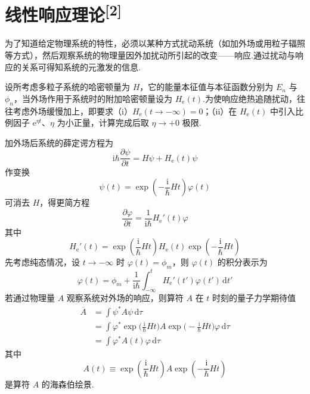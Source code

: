 \section{\texorpdfstring{线性响应理论\textsuperscript{[2]}}{线性响应理论[2]}}

为了知道给定物理系统的特性，必须以某种方式扰动系统（如加外场或用粒子辐照等方式），然后观察系统的物理量因外加扰动所引起的改变——响应.通过扰动与响应的关系可得知系统的元激发的信息.

设所考虑多粒子系统的哈密顿量为 $H$，它的能量本征值与本征函数分别为 $E_{n}$ 与 $\phi_{n}$，当外场作用于系统时的附加哈密顿量设为 $H_{\mathrm{e}}(t)$.为使响应绝热追随扰动，往往考虑外场缓慢加上，即要求（i）$H_{\mathrm{e}}(t\to-\infty)=0$；（ii）在 $H_{\mathrm{e}}(t)$ 中引入比例因子 $\mathrm{e}^{\eta t}$、$\eta$ 为小正量，计算完成后取 $\eta\to+0$ 极限.

加外场后系统的薛定谔方程为
\begin{equation}
  \mathrm{i}\hbar\frac{\partial\psi}{\partial t}
  =H\psi+H_{\mathrm{e}}(t)\psi
\end{equation}
作变换
\begin{equation}
  \psi(t)=\exp\left(-\frac{\mathrm{i}}{\hbar}Ht\right)\varphi(t)
\end{equation}
可消去 $H$，得更简方程
\begin{equation}
  \frac{\partial\varphi}{\partial t}
  =\frac{1}{\mathrm{i}\hbar}H_{\mathrm{e}}'(t)\varphi
\end{equation}
其中
\begin{equation}
  H_{\mathrm{e}}'(t)=\exp\left(\frac{\mathrm{i}}{\hbar}Ht\right)H_{\mathrm{e}}(t)
  \exp\left(-\frac{\mathrm{i}}{\hbar}Ht\right)
\end{equation}
先考虑纯态情况，设 $t\to-\infty$ 时 $\varphi(t)=\phi_{m}$，则 $\varphi(t)$ 的积分表示为
\begin{equation}
  \varphi(t)=\phi_{m}+\frac{1}{\mathrm{i}\hbar}
  \int_{-\infty}^{t}H_{\mathrm{e}}'(t')\varphi(t')\,\mathrm{d}t'
\end{equation}
若通过物理量 $A$ 观察系统对外场的响应，则算符 $A$ 在 $t$ 时刻的量子力学期待值
\begin{equation}
\begin{aligned}
  \overline{A}&=\int\psi^{*}A\psi\,\mathrm{d}\tau\\
  &=\int\varphi^{*}\exp\Big(\frac{\mathrm{i}}{\hbar}Ht\Big)A
  \exp\Big(-\frac{\mathrm{i}}{\hbar}Ht\Big)\varphi\,\mathrm{d}\tau\\
  &=\int\varphi^{*}A(t)\varphi\,\mathrm{d}\tau
\end{aligned}
\end{equation}
其中
\begin{equation}
  A(t)\equiv\exp\left(\frac{\mathrm{i}}{\hbar}Ht\right)A
  \exp\left(-\frac{\mathrm{i}}{\hbar}Ht\right)
\end{equation}
是算符 $A$ 的海森伯绘景.

